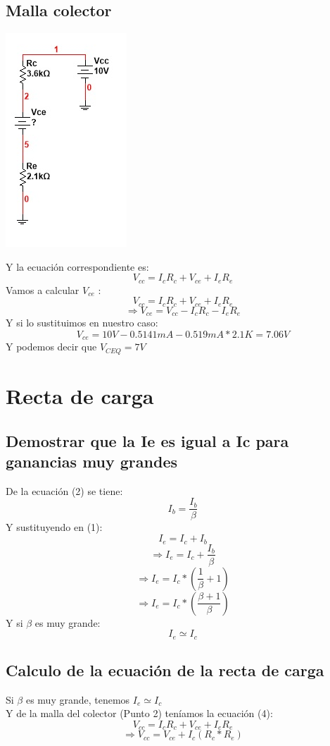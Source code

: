 \documentclass[10pt,a4paper]{article}
\begin{document}
\subsection{Malla colector}
\begin{center}
\includegraphics[scale=1]{Images/Imagen7.jpg}
\end{center}
Y la ecuación correspondiente es:
\begin{equation}
V_{cc}=I_{c}R_{c}+V_{ce}+I_{e}R_{e}
\end{equation}
Vamos a calcular $V_{ce}$ :
\[V_{cc}=I_{c}R_{c}+V_{ce}+I_{e}R_{e}\]
\[\Rightarrow V_{ce}= V_{cc}-I_{c}R_{c}-I_{e}R_{e}\]
Y si lo sustituimos en nuestro caso:
\[V_{ce}= 10V-0.5141mA-0.519mA*2.1K= 7.06V\]
Y podemos decir que $V_{CEQ}=7V$
\section{Recta de carga}
\subsection{Demostrar que la Ie es igual a Ic para ganancias muy grandes}
De la ecuación (2) se tiene:
\[I_{b}=\frac{I_{b}}{\beta}\]
Y sustituyendo en (1):
\[I_{e}=I_{c}+I_{b}\]
\[\Rightarrow I_{e}=I_{c}+\frac{I_{b}}{\beta}\]
\[\Rightarrow I_{e}=I_{c}*(\frac{1}{\beta}+1)\]
\[\Rightarrow I_{e}=I_{c}*(\frac{\beta+1}{\beta})\]
Y si $\beta$ es muy grande:
\[I_{e}\simeq I_{c}\] 
\subsection{Calculo de la ecuación de la recta de carga}
Si $\beta$ es muy grande, tenemos $I_{e}\simeq I_{c}$ 
\\
Y de la malla del colector (Punto 2) teníamos la ecuación (4):
\[V_{cc}=I_{c}R_{c}+V_{ce}+I_{e}R_{e}\]
\begin{equation}
\Rightarrow V_{cc}=V_{ce}+I_{c}(R_{c}*R_{e})
\end{equation}
\end{document}
